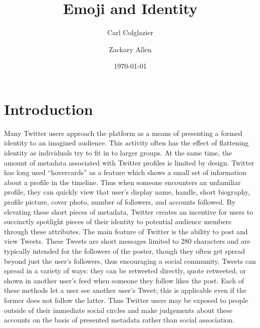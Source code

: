 \documentclass[manuscript, authordraft]{acmart}
\begin{document}
\title{Emoji and Identity}

\author{Carl Colglazier}
\author{Zackary Allen}
\date{\today}
\maketitle

\begin{abstract}
\end{abstract}

\section{Introduction}
Many Twitter users approach the platform as a means of presenting a
formed identity to an imagined audience\cite{marwick2011tweet}. This
activity often has the effect of flattening identity as individuals
try to fit in to larger groups\cite{boyd2008taken}. At the same time,
the amount of metadata associated with Twitter profiles is limited by
design. Twitter has long used ``hovercards'' as a feature which shows
a small set of information about a profile in the
timeline\cite{twitterhover}. Thus when someone encounters an
unfamiliar profile, they can quickly view that user’s display name,
handle, short biography, profile picture, cover photo, number of
followers, and accounts followed. By elevating these short pieces of
metadata, Twitter creates an incentive for users to succinctly
spotlight pieces of their identity to potential audience members
through these attributes.  The main feature of Twitter is the ability
to post and view Tweets. These Tweets are short messages limited to
280 characters and are typically intended for the followers of the
poster, though they often get spread beyond just the user’s followers,
thus encouraging a social community. Tweets can spread in a variety of
ways: they can be retweeted directly, quote retweeted, or shown in
another user’s feed when someone they follow likes the post. Each of
these methods let a user see another user’s Tweet; this is applicable
even if the former does not follow the latter. Thus Twitter users may
be exposed to people outside of their immediate social circles and
make judgements about these accounts on the basis of presented
metadata rather than social association.
\end{document}
